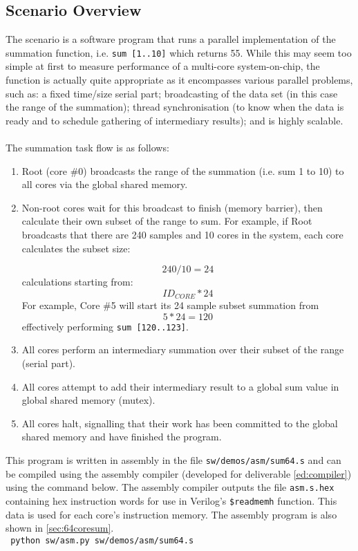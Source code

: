 \subsection{Scenario Overview}
The scenario is a software program that runs a parallel implementation of the summation function, i.e. \verb|sum [1..10]| which returns 55. While this may seem too simple at first to measure performance of a multi-core system-on-chip, the function is actually quite appropriate as it encompasses various parallel problems, such as: a fixed time/size serial part; broadcasting of the data set (in this case the range of the summation); thread synchronisation (to know when the data is ready and to schedule gathering of intermediary results); and is highly scalable.
\\\\
The summation task flow is as follows:
\begin{enumerate}
\item Root (core \#0) broadcasts the range of the summation (i.e. sum 1 to 10) to all cores via the global shared memory.
\item Non-root cores wait for this broadcast to finish (memory barrier), then calculate their own subset of the range to sum. For example, if Root broadcasts that there are 240 samples and 10 cores in the system, each core calculates the subset size:

\begin{equation}
240/10 = 24
\end{equation} calculations starting from:
\begin{equation}
{ID_{CORE}} * 24
\end{equation}
For example, Core \#5 will start its 24 sample subset summation from
\begin{equation}
5 * 24 = 120
\end{equation}
effectively performing \verb|sum [120..123]|.

\item All cores perform an intermediary summation over their subset of the range (serial part).
\item All cores attempt to add their intermediary result to a global sum value in global shared memory (mutex).
\item All cores halt, signalling that their work has been committed to the global shared memory and have finished the program.
\end{enumerate}

This program is written in assembly in the file \verb|sw/demos/asm/sum64.s| and can be compiled using the assembly compiler (developed for deliverable \ref{ed:compiler}) using the command below. The assembly compiler outputs the file \verb|asm.s.hex| containing hex instruction words for use in Verilog's \verb|$readmemh| function. This data is used for each core's instruction memory. The assembly program is also shown in \cref{sec:64coresum}.
\\
\texttt{                      python sw/asm.py sw/demos/asm/sum64.s}

